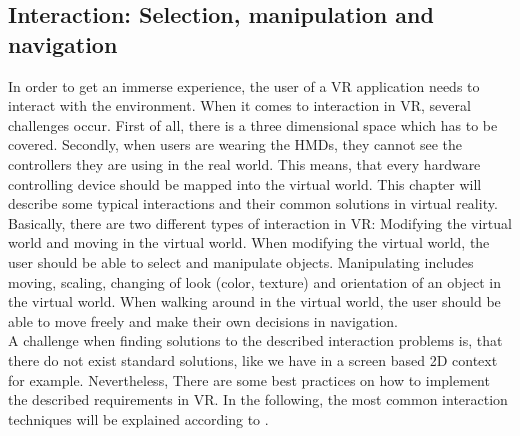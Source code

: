 \subsection{Interaction: Selection, manipulation and navigation}
In order to get an immerse experience, the user of a VR application needs to interact with the environment. When it comes to interaction in VR, several challenges occur. First of all, there is a three dimensional space which has to be covered. Secondly, when users are wearing the HMDs, they cannot see the controllers they are using in the real world. This means, that every hardware controlling device should be mapped into the virtual world. This chapter will describe some typical interactions and their common solutions in virtual reality.\\
Basically, there are two different types of interaction in VR: Modifying the virtual world and moving in the virtual world. When modifying the virtual world, the user should be able to select and manipulate objects. Manipulating includes moving, scaling, changing of look (color, texture) and orientation of an object in the virtual world. When walking around in the virtual world, the user should be able to move freely and make their own decisions in navigation. \cite{Dorner.2013}\\
A challenge when finding solutions to the described interaction problems is, that there do not exist standard solutions, like we have in a screen based 2D context for example. Nevertheless, There are some best practices on how to implement the described requirements in VR. In the following, the most common interaction techniques will be explained according to \cite{Dorner.2013}.

